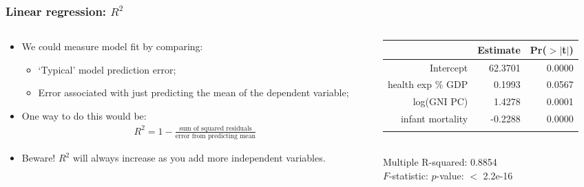 \documentclass[aspectratio=169]{beamer}
\theoremstyle{principle}
\begin{document}
\begin{frame}
\frametitle{Linear regression: $R^2$}

\begin{columns}
\begin{column}{0.5\textwidth}

\begin{itemize}
\item We could measure model fit by comparing:
\begin{itemize}
\item `Typical' model prediction error;
\item Error associated with just predicting the mean of the dependent variable;
 \end{itemize}
\bigskip

\item One way to do this would be:
\begin{align*}
R^2 = 1 - \frac{\mbox{sum of squared residuals}}{\mbox{error from predicting mean}}
\end{align*}

\item Beware!  $R^2$ will always increase as you add more independent variables.

\end{itemize}

\end{column}
\begin{column}{0.5\textwidth}

\begin{table}[ht]
\centering
\begin{tabular}{rrr}
  \hline
   \hline
 & Estimate & Pr($>$$|$t$|$) \\ 
  \hline
   \hline
Intercept & 62.3701 & 0.0000 \\ 
  health exp \% GDP & 0.1993 & 0.0567 \\ 
  log(GNI PC) & 1.4278 & 0.0001 \\ 
  infant mortality & -0.2288 & 0.0000 \\ 
   \hline
   \hline
   &&\\
\end{tabular}\\
Multiple R-squared:  0.8854\\ 
\color{white}$F$-statistic: $p$-value: $<$ 2.2e-16
\end{table}

\end{column}
\end{columns}

\end{frame}
\end{document}
